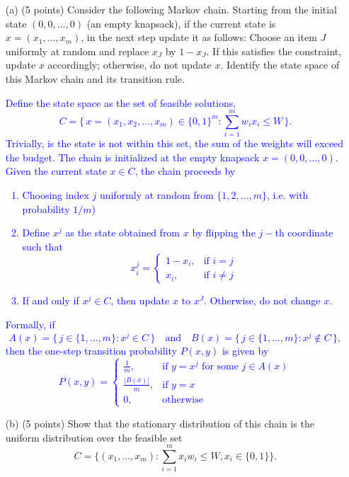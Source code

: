 \documentclass{article}
\begin{document}
\begin{itemize}
    \item[(a)] (5 points) Consider the following Markov chain. Starting from the initial state $(0,0, \dots, 0)$ (an empty knapsack), if the current state is $x = (x_1, \dots, x_m)$, in the next step update it as follows: Choose an item $J$ uniformly at random and replace $x_J$ by $1 - x_J$. If this satisfies the constraint, update $x$ accordingly; otherwise, do not update $x$. Identify the state space of this Markov chain and its transition rule.

        \textcolor{blue}{
            Define the state space as the set of feasible solutions,
\[
C = \{\, x = (x_1, x_2, \dots, x_m) \in \{0,1\}^m : \sum_{i=1}^m w_i x_i \le W \,\}.
\]
Trivially, is the state is not within this set, the sum of the weights will exceed the budget. The chain is initialized at the empty knapsack \( x = (0,0,\dots,0) \). Given the current state \( x \in C \), the chain proceeds by
\begin{enumerate}
    \item Choosing index \( j \) uniformly at random from \( \{1,2,\dots, m\} \), i.e. with probability \(1/m\))
    \item Define \( x^j \) as the state obtained from \( x \) by flipping the \( j- \)th coordinate such that 
    \[
    x^j_i = 
    \begin{cases}
    1-x_i, & \text{if } i=j \\
    x_i, & \text{if } i\neq j
    \end{cases}
    \]
    \item If and only if \( x^j \in C \), then update \( x \) to \( x^J \). Otherwise, do not change $x$.
\end{enumerate}
Formally, if
\[
A(x) = \{\, j \in \{1,\dots, m\} : x^j \in C \,\} \quad \text{and} \quad B(x) = \{\, j \in \{1,\dots, m\} : x^j \notin C \,\},
\]
then the one-step transition probability \( P(x,y) \) is given by
\[
P(x,y) =
\begin{cases}
\displaystyle \frac{1}{m}, & \text{if } y = x^j \text{ for some } j \in A(x) \\[2mm]
\displaystyle \frac{|B(x)|}{m}, & \text{if } y = x \\[2mm]
0, & \text{otherwise}
\end{cases}
\]
        }
    
    \item[(b)] (5 points) Show that the stationary distribution of this chain is the uniform distribution over the feasible set 
    \[
    C = \{(x_1, \dots, x_m) : \sum_{i=1}^{m} x_i w_i \leq W, x_i \in \{0,1\}\}.
    \]


\end{itemize}
\end{document}
